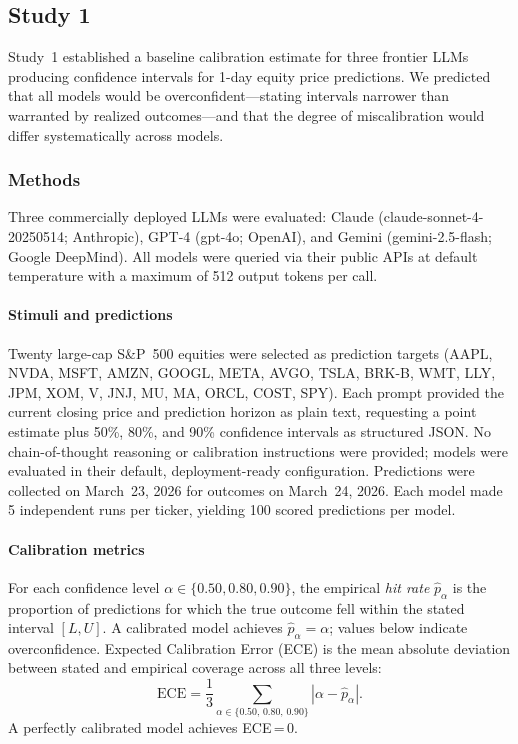 
\subsection*{Study 1}

Study~1 established a baseline calibration estimate for three frontier LLMs
producing confidence intervals for 1-day equity price predictions. We predicted
that all models would be overconfident---stating intervals narrower than warranted
by realized outcomes---and that the degree of miscalibration would differ
systematically across models.

\subsubsection*{Methods}

Three commercially deployed LLMs were evaluated: Claude
(claude-sonnet-4-20250514; Anthropic), GPT-4 (gpt-4o; OpenAI), and Gemini
(gemini-2.5-flash; Google DeepMind). All models were queried via their public
APIs at default temperature with a maximum of 512 output tokens per call.

\paragraph{Stimuli and predictions} Twenty large-cap S\&P~500 equities
were selected as prediction targets (AAPL, NVDA, MSFT, AMZN, GOOGL, META,
AVGO, TSLA, BRK-B, WMT, LLY, JPM, XOM, V, JNJ, MU, MA, ORCL, COST, SPY).
Each prompt provided the current closing price and prediction horizon as plain
text, requesting a point estimate plus 50\%, 80\%, and 90\% confidence
intervals as structured JSON. No chain-of-thought reasoning or calibration
instructions were provided; models were evaluated in their default,
deployment-ready configuration. Predictions were collected on March~23, 2026
for outcomes on March~24, 2026. Each model made 5 independent runs per
ticker, yielding 100 scored predictions per model.

\paragraph{Calibration metrics} For each confidence level
$\alpha \in \{0.50, 0.80, 0.90\}$, the empirical \textit{hit rate}
$\hat{p}_\alpha$ is the proportion of predictions for which the true outcome
fell within the stated interval $[L, U]$. A calibrated model achieves
$\hat{p}_\alpha = \alpha$; values below indicate overconfidence. Expected
Calibration Error (ECE) is the mean absolute deviation between stated and
empirical coverage across all three levels:
\begin{equation}
  \label{eq:ece}
  \text{ECE} = \frac{1}{3} \sum_{\alpha \in \{0.50,\,0.80,\,0.90\}}
               \left| \alpha - \hat{p}_\alpha \right|.
\end{equation}
A perfectly calibrated model achieves ECE\,=\,0.

